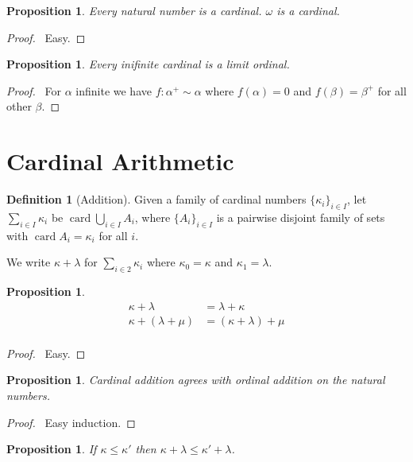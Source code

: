 \documentclass{report}
\let\qed\relax
\newtheorem{prop}[ax]{Proposition}
\theoremstyle{definition}
\newtheorem{df}[ax]{Definition}
\newcommand{\card}{\ensuremath{\operatorname{card}}}
\begin{document}
\begin{prop}
Every natural number is a cardinal. $\omega$ is a cardinal.
\end{prop}

\begin{proof}
\pf\ Easy. \qed
\end{proof}

\begin{prop}
Every inifinite cardinal is a limit ordinal.
\end{prop}

\begin{proof}
\pf\ For $\alpha$ infinite we have $f : \alpha^+ \sim \alpha$ where $f(\alpha) = 0$ and $f(\beta) = \beta^+$ for all other $\beta$. \qed
\end{proof}

\section{Cardinal Arithmetic}

\begin{df}[Addition]
Given a family of cardinal numbers $\{ \kappa_i \}_{i \in I}$, let $\sum_{i \in I} \kappa_i$ be $\card \bigcup_{i \in I} A_i$, where $\{A_i\}_{i \in I}$ is a pairwise disjoint family of sets with $\card A_i = \kappa_i$ for all $i$.

We write $\kappa + \lambda$ for $\sum_{i \in 2} \kappa_i$ where $\kappa_0 = \kappa$ and $\kappa_1 = \lambda$.
\end{df}

\begin{prop}
\begin{align*}
\kappa + \lambda & = \lambda + \kappa \\
\kappa + (\lambda + \mu) & = (\kappa + \lambda) + \mu \\
\end{align*}
\end{prop}

\begin{proof}
\pf\ Easy. \qed
\end{proof}

\begin{prop}
Cardinal addition agrees with ordinal addition on the natural numbers.
\end{prop}

\begin{proof}
\pf\ Easy induction. \qed
\end{proof}

\begin{prop}
If $\kappa \leq \kappa'$ then $\kappa + \lambda \leq \kappa' + \lambda$.
\end{prop}
\end{document}
